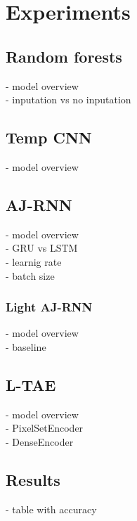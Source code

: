 \section{Experiments}

\subsection{Random forests}
- model overview\\
- inputation vs no inputation

\subsection{Temp CNN}
- model overview

\subsection{AJ-RNN}
- model overview\\
- GRU vs LSTM\\
- learnig rate\\
- batch size\\

\subsubsection{Light AJ-RNN}
- model overview\\
- baseline

\subsection{L-TAE}
- model overview\\
- PixelSetEncoder\\
- DenseEncoder

\subsection{Results}

- table with accuracy
